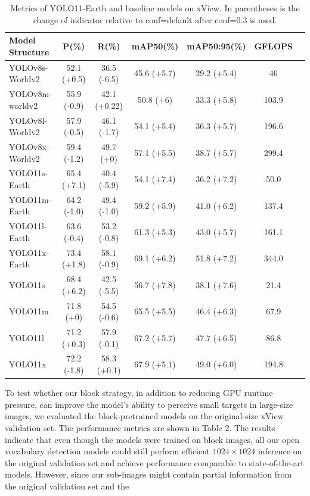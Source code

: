 \documentclass{article}
\begin{document}
\begin{table}[ht]
\centering
\caption{Metrics of YOLO11-Earth and baseline models on xView. In parentheses is the change of indicator relative to conf=default after conf=0.3 is used.}
\begin{tabular}{lcccccc}
\toprule
\textbf{Model Structure} & \textbf{P}(\%) & \textbf{R}(\%) & \textbf{mAP50}(\%) & \textbf{mAP50:95}(\%) & \textbf{GFLOPS} \\
\midrule
YOLOv8s-Worldv2 & 52.1 (+0.5) & 36.5 (-6.5) & 45.6 (+5.7) & 29.2 (+5.4) & 46 \\
YOLOv8m-worldv2 & 55.9 (-0.9) & 42.1 (+0.22) & 50.8 (+6) & 33.3 (+5.8) & 103.9 \\
YOLOv8l-Worldv2 & 57.9 (-0.5) & 46.1 (-1.7) & 54.1 (+5.4) & 36.3 (+5.7) & 196.6 \\
YOLOv8x-Worldv2 & 59.4 (-1.2) & 49.7 (+0) & 57.1 (+5.5) & 38.7 (+5.7) & 299.4 \\
\midrule
YOLO11s-Earth & 65.4 (+7.1) & 40.4 (-5.9) & 54.1 (+7.4) & 36.2 (+7.2) & 50.0 \\
YOLO11m-Earth & 64.2 (-1.0) & 49.4 (-1.0) & 59.2 (+5.9) & 41.0 (+6.2) & 137.4 \\
YOLO11l-Earth & 63.6 (-0.4) & 53.2 (-0.8) & 61.3 (+5.3) & 43.0 (+5.7) & 161.1 \\
YOLO11x-Earth & 73.4 (+1.8) & 58.1 (-0.9) & 69.1 (+6.2) & 51.8 (+7.2) & 344.0 \\
\midrule
YOLO11s & 68.4 (+6.2) & 42.5 (-5.5) & 56.7 (+7.8) & 38.1 (+7.6) & 21.4 \\
YOLO11m & 71.8 (+0) & 54.5 (-0.6) & 65.5 (+5.5) & 46.4 (+6.3) & 67.9 \\
YOLO11l & 71.2 (+0.3) & 57.9 (-0.1) & 67.2 (+5.7) & 47.7 (+6.5) & 86.8 \\
YOLO11x & 72.2 (-1.8) & 58.3 (+0.1) & 67.9 (+5.1) & 49.0 (+6.0) & 194.8 \\
\bottomrule
\end{tabular}
\end{table}
To test whether our block strategy, in addition to reducing GPU runtime pressure, can improve the model's ability 
to perceive small targets in large-size images, we evaluated the block-pretrained models on the original-size 
xView validation set. The performance metrics are shown in Table 2. The results indicate that even though the 
models were trained on block images, all our open vocabulary detection models could still perform efficient 
$1024 \times 1024$ inference on the original validation set and achieve performance comparable to state-of-the-art 
models. However, since our sub-images might contain partial information from the original validation set and the 
\end{document}
